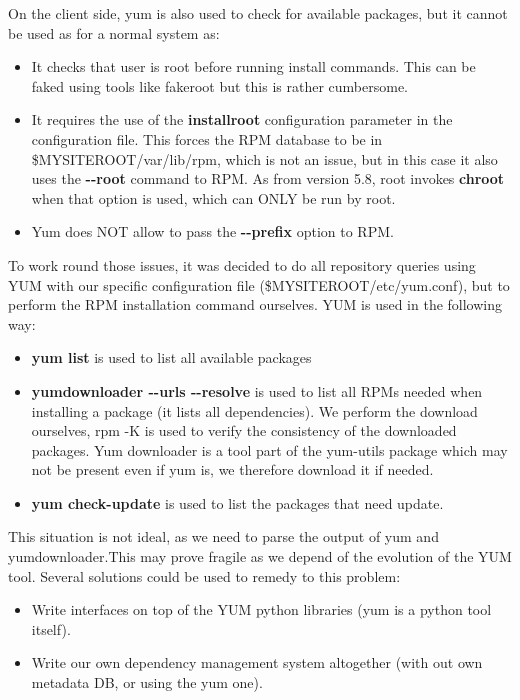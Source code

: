 \documentclass{lhcbnote}
\begin{document}
On the client side, yum is also used to check for available packages, but it cannot be used as for a normal system as:
\begin{itemize}
\item It checks that user is root before running install commands. This can be faked using tools like fakeroot but this is rather cumbersome.
\item It requires the use of the \textbf{installroot} configuration parameter in the configuration file. This forces the RPM database to be in \$MYSITEROOT/var/lib/rpm, which is not an issue, but in this case it also uses the  \textbf{\textrm{-}\textrm{-}root} command to RPM. As from version 5.8, root invokes \textbf{chroot} when that option is used, which can ONLY be run by root.
\item Yum does NOT allow to pass the \textbf{\textrm{-}\textrm{-}prefix} option to RPM.
\end{itemize}

To work round those issues, it was decided to do all repository queries using YUM with our specific configuration file (\$MYSITEROOT/etc/yum.conf), but to perform the RPM installation command ourselves. YUM is used in the following way:

\begin{itemize}
\item \textbf{yum list} is used to list all available packages 
\item \textbf{yumdownloader \textrm{-}\textrm{-}urls \textrm{-}\textrm{-}resolve} is used to list all RPMs needed when installing a package (it lists all dependencies). We perform the download ourselves, rpm -K is used to verify the consistency of the downloaded packages. Yum downloader is a tool part of the yum-utils package which may not be present even if yum is, we therefore download it if needed.
\item \textbf{yum check\textrm{-}update} is used to list the packages that need update.
\end{itemize}

This situation is not ideal, as we need to parse the output of yum and yumdownloader.This may prove fragile as we depend of the evolution of the YUM tool. Several solutions could be used to remedy to this problem:
\begin{itemize}
\item Write interfaces on top of the YUM python libraries (yum is a python tool itself).
\item Write our own dependency management system altogether (with out own metadata DB, or using the yum one).
\end{itemize}
\end{document}
